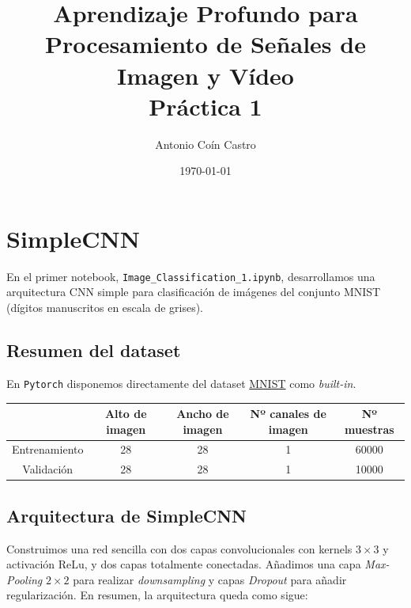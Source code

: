 \documentclass[11pt]{article}
\author{Antonio Coín Castro}
\date{\today}
\title{Aprendizaje Profundo para Procesamiento de Señales de Imagen y Vídeo\\\Large{Práctica 1}}
\begin{document}
\maketitle

\section{SimpleCNN}

En el primer notebook, \verb|Image_Classification_1.ipynb|, desarrollamos una arquitectura CNN simple para clasificación de imágenes del conjunto MNIST (dígitos manuscritos en escala de grises).

\subsection*{Resumen del dataset}

En \verb|Pytorch| disponemos directamente del dataset \href{https://pytorch.org/vision/stable/datasets.html#mnist}{MNIST} como \textit{built-in}.

\begin{table}[h!]
   \centering
  \begin{tabular}{c|cccc}
    & Alto de imagen & Ancho de imagen & Nº canales de imagen & Nº muestras\\
    \hline
    Entrenamiento & 28 & 28 & 1 & 60000\\
    Validación & 28 & 28 & 1 & 10000\\
  \end{tabular}
\end{table}

\subsection*{Arquitectura de SimpleCNN}

Construimos una red sencilla con dos capas convolucionales con kernels $3\times 3$ y activación ReLu, y dos capas totalmente conectadas. Añadimos una capa \textit{Max-Pooling} $2\times 2$ para realizar \textit{downsampling} y capas \textit{Dropout} para añadir regularización. En resumen, la arquitectura queda como sigue:
\end{document}

